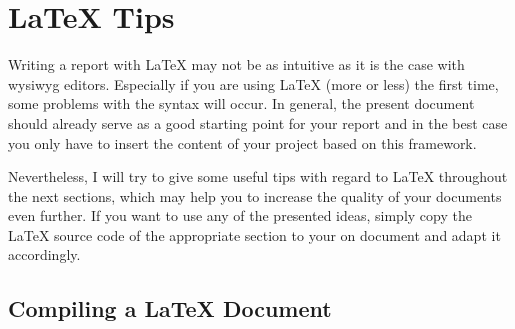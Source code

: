 
\chapter{\LaTeX{} Tips}

Writing a report with \LaTeX{} may not be as intuitive as it is the
case with \gls{wysiwyg} editors. Especially if you are using \LaTeX{}
(more or less) the first time, some problems with the syntax will
occur. In general, the present document should already serve as a good
starting point for your report and in the best case you only have to
insert the content of your project based on this framework.

Nevertheless, I will try to give some useful tips with regard to
\LaTeX{} throughout the next sections, which may help you to increase
the quality of your documents even further. If you want to use any of
the presented ideas, simply copy the \LaTeX{} source code of the
appropriate section to your on document and adapt it accordingly.


\section{Compiling a \LaTeX{} Document}
\label{sec:compiling}


